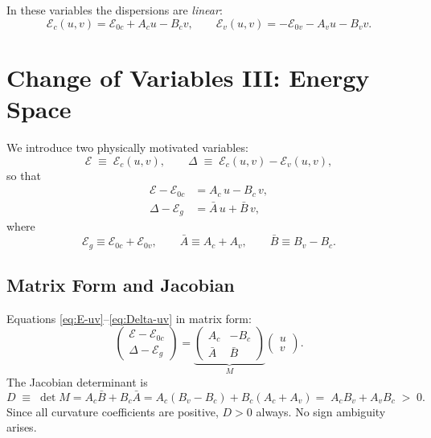 \documentclass[11pt,a4paper]{article}
\newcommand{\E}{\mathcal{E}}              %
\newcommand{\Ec}{\E_c}
\newcommand{\Ev}{\E_v}
\newcommand{\Eoc}{\E_{0c}}
\newcommand{\Eov}{\E_{0v}}
\newcommand{\Eg}{\E_g}
\newcommand{\Abar}{\bar{A}}
\newcommand{\Bbar}{\bar{B}}
\begin{document}
In these variables the dispersions are \emph{linear}:
\begin{equation}\label{eq:lin-disp}
  \Ec(u,v) = \Eoc + A_c u - B_c v,
  \qquad
  \Ev(u,v) = -\Eov - A_v u - B_v v.
\end{equation}

\section{Change of Variables III: Energy Space}

We introduce two physically motivated variables:
\begin{equation}\label{eq:E-Delta-def}
  \E \;\equiv\; \Ec(u,v), \qquad
  \Delta \;\equiv\; \Ec(u,v) - \Ev(u,v),
\end{equation}
so that
\begin{align}
  \E - \Eoc &= A_c\, u - B_c\, v, \label{eq:E-uv}\\
  \Delta - \Eg &= \Abar\, u + \Bbar\, v, \label{eq:Delta-uv}
\end{align}
where
\begin{equation}\label{eq:combined-params}
  \boxed{\;
    \Eg \equiv \Eoc + \Eov, \qquad
    \Abar \equiv A_c + A_v, \qquad
    \Bbar \equiv B_v - B_c.
  \;}
\end{equation}

\subsection{Matrix Form and Jacobian}

Equations \eqref{eq:E-uv}--\eqref{eq:Delta-uv} in matrix form:
\begin{equation}\label{eq:M}
  \begin{pmatrix} \E - \Eoc \\ \Delta - \Eg \end{pmatrix}
  = \underbrace{\begin{pmatrix} A_c & -B_c \\ \Abar & \Bbar \end{pmatrix}}_{M}
  \begin{pmatrix} u \\ v \end{pmatrix}.
\end{equation}
The Jacobian determinant is
\begin{equation}\label{eq:D}
  D \;\equiv\; \det M = A_c\Bbar + B_c\Abar
  = A_c(B_v - B_c) + B_c(A_c + A_v)
  = \boxed{\;A_c B_v + A_v B_c \;>\; 0.\;}
\end{equation}
Since all curvature coefficients are positive, $D>0$ always. No sign ambiguity arises.
\end{document}
